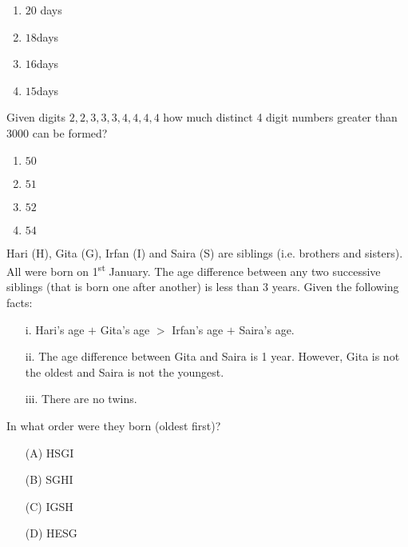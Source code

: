 \begin{multicols}{2}
\begin{enumerate}
    \item $20$ days
    \item $18$days
    \item $16$days
    \item $15$days
\end{enumerate}    
\end{multicols}
\item[64)] Given digits $2,2,3,3,3,4,4,4,4$ how much distinct 4 digit numbers greater than 3000 can be formed?
\begin{multicols}{2}
\begin{enumerate}
    \item $50$
    \item $51$
    \item $52$
    \item $54$
\end{enumerate}    
\end{multicols}
\item[65)] Hari (H), Gita (G), Irfan (I) and Saira (S) are siblings (i.e. brothers and sisters). All were born on 1\textsuperscript{st} January. The age difference between any two successive siblings (that is born one after another) is less than 3 years. Given the following facts:

\begin{itemize}
    \item[i.] Hari's age \( + \) Gita's age \( > \) Irfan's age \( + \) Saira's age.
    \item[ii.] The age difference between Gita and Saira is 1 year. However, Gita is not the oldest and Saira is not the youngest.
    \item[iii.] There are no twins.
\end{itemize}

In what order were they born (oldest first)?

\begin{itemize}
    \item[(A)] HSGI
    \item[(B)] SGHI
    \item[(C)] IGSH
    \item[(D)] HESG
\end{itemize}
